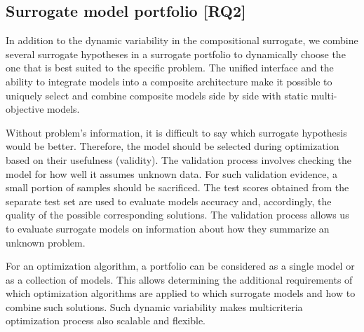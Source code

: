             
        
        \subsection{Surrogate model portfolio [RQ2]}
            In addition to the dynamic variability in the compositional surrogate, we combine several surrogate hypotheses in a surrogate portfolio to dynamically choose the one that is best suited to the specific problem. The unified interface and the ability to integrate models into a composite architecture make it possible to uniquely select and combine composite models side by side with static multi-objective models.

            Without problem's information, it is difficult to say which surrogate hypothesis would be better. Therefore, the model should be selected during optimization based on their usefulness (validity). The validation process involves checking the model for how well it assumes unknown data. For such validation evidence, a small portion of samples should be sacrificed. The test scores obtained from the separate test set are used to evaluate models accuracy and, accordingly, the quality of the possible corresponding solutions.
            The validation process allows us to evaluate surrogate models on information about how they summarize an unknown problem.
            
            For an optimization algorithm, a portfolio can be considered as a single model or as a collection of models. This allows determining the additional requirements of which optimization algorithms are applied to which surrogate models and how to combine such solutions. Such dynamic variability makes multicriteria optimization process also scalable and flexible.
            
